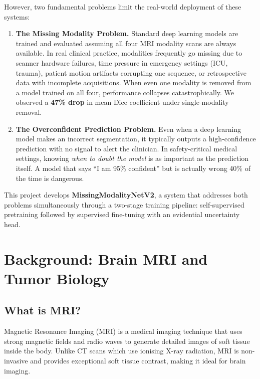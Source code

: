 \documentclass[12pt,a4paper]{article}
\newcommand{\term}[1]{\textbf{\textcolor{mainblue}{#1}}}
\begin{document}
However, two fundamental problems limit the real-world deployment of these systems:

\begin{enumerate}[leftmargin=*, label=\textbf{\arabic*.}]
  \item \textbf{The Missing Modality Problem.}
  Standard deep learning models are trained and evaluated assuming all four MRI modality scans are always available. In real clinical practice, modalities frequently go missing due to scanner hardware failures, time pressure in emergency settings (ICU, trauma), patient motion artifacts corrupting one sequence, or retrospective data with incomplete acquisitions. When even one modality is removed from a model trained on all four, performance collapses catastrophically. We observed a \textbf{47\% drop} in mean Dice coefficient under single-modality removal.

  \item \textbf{The Overconfident Prediction Problem.}
  Even when a deep learning model makes an incorrect segmentation, it typically outputs a high-confidence prediction with no signal to alert the clinician. In safety-critical medical settings, knowing \emph{when to doubt the model} is as important as the prediction itself. A model that says ``I am 95\% confident'' but is actually wrong 40\% of the time is dangerous.
\end{enumerate}

This project develops \term{MissingModalityNetV2}, a system that addresses both problems simultaneously through a two-stage training pipeline: self-supervised pretraining followed by supervised fine-tuning with an evidential uncertainty head.

\section{Background: Brain MRI and Tumor Biology}

\subsection{What is MRI?}

Magnetic Resonance Imaging (MRI) is a medical imaging technique that uses strong magnetic fields and radio waves to generate detailed images of soft tissue inside the body. Unlike CT scans which use ionising X-ray radiation, MRI is non-invasive and provides exceptional soft tissue contrast, making it ideal for brain imaging.
\end{document}
